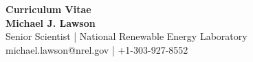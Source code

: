 \documentclass[10pt]{article}
\begin{document}
\begin{centering}
\textbf{\large{Curriculum Vitae}}\\
\textbf{Michael J. Lawson}\\
Senior Scientist | National Renewable Energy Laboratory\\
michael.lawson@nrel.gov | +1-303-927-8552\\
\end{centering}



\vspace{-0.15in}


\vspace{-0.2in}


\vspace{-0.15in}


\vspace{-0.15in}


\vspace{-0.15in}


% 

% 
\end{document}
